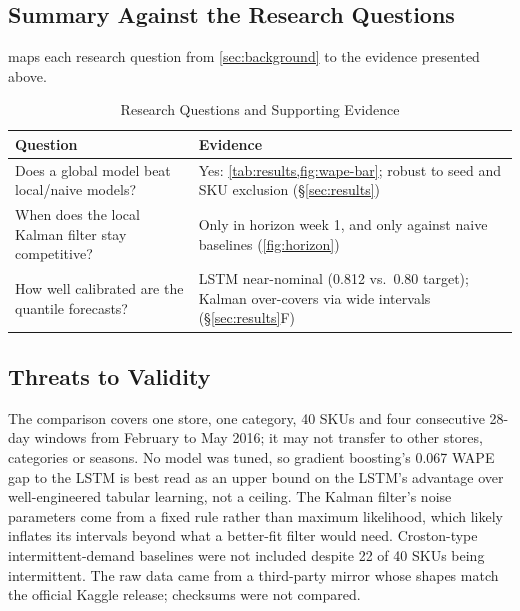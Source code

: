 \documentclass[conference]{IEEEtran}
\begin{document}
\subsection{Summary Against the Research Questions}
 maps each research question from \cref{sec:background} to the evidence
presented above.

\begin{table}[t]
\centering
\caption{Research Questions and Supporting Evidence}
\label{tab:objectives}
\footnotesize
\begin{tabularx}{\columnwidth}{@{}>{\raggedright\arraybackslash}p{} X@{}}
\toprule
Question & Evidence \\
\midrule
Does a global model beat local/naive models? & Yes: \cref{tab:results,fig:wape-bar}; robust to seed
  and SKU exclusion (\S\ref{sec:results}) \\
When does the local Kalman filter stay competitive? & Only in horizon week 1, and only against
  naive baselines (\cref{fig:horizon}) \\
How well calibrated are the quantile forecasts? & LSTM near-nominal (0.812 vs.\ 0.80 target);
  Kalman over-covers via wide intervals (\S\ref{sec:results}F) \\
\bottomrule
\end{tabularx}
\end{table}

\subsection{Threats to Validity}
The comparison covers one store, one category, 40 SKUs and four consecutive 28-day windows from
February to May 2016; it may not transfer to other stores, categories or seasons. No model was
tuned, so gradient boosting's 0.067 WAPE gap to the LSTM is best read as an upper bound on the
LSTM's advantage over well-engineered tabular learning, not a ceiling. The Kalman filter's noise
parameters come from a fixed rule rather than maximum likelihood, which likely inflates its
intervals beyond what a better-fit filter would need. Croston-type intermittent-demand baselines
were not included despite 22 of 40 SKUs being intermittent. The raw data came from a third-party
mirror whose shapes match the official Kaggle release; checksums were not compared.

\end{document}

